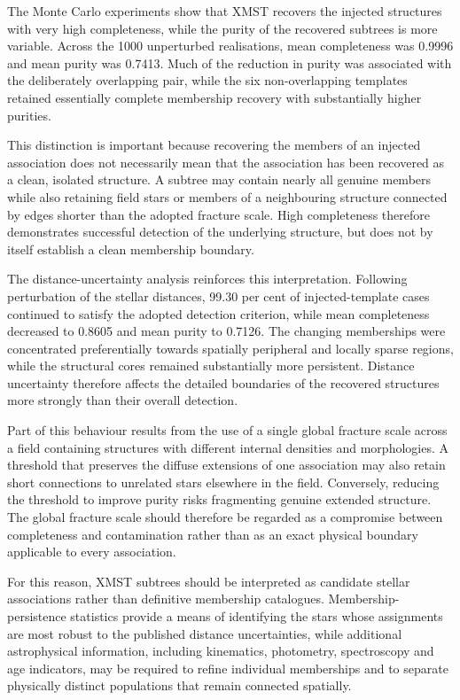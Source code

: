 \documentclass[fleqn,usenatbib]{mnras}
\begin{document}
The Monte Carlo experiments show that XMST recovers the injected structures with very high completeness, while the purity of the recovered subtrees is more variable. Across the 1000 unperturbed realisations, mean completeness was 0.9996 and mean purity was 0.7413. Much of the reduction in purity was associated with the deliberately overlapping pair, while the six non-overlapping templates retained essentially complete membership recovery with substantially higher purities.

This distinction is important because recovering the members of an injected association does not necessarily mean that the association has been recovered as a clean, isolated structure. A subtree may contain nearly all genuine members while also retaining field stars or members of a neighbouring structure connected by edges shorter than the adopted fracture scale. High completeness therefore demonstrates successful detection of the underlying structure, but does not by itself establish a clean membership boundary.

The distance-uncertainty analysis reinforces this interpretation. Following perturbation of the stellar distances, 99.30 per cent of injected-template cases continued to satisfy the adopted detection criterion, while mean completeness decreased to 0.8605 and mean purity to 0.7126. The changing memberships were concentrated preferentially towards spatially peripheral and locally sparse regions, while the structural cores remained substantially more persistent. Distance uncertainty therefore affects the detailed boundaries of the recovered structures more strongly than their overall detection.

Part of this behaviour results from the use of a single global fracture scale across a field containing structures with different internal densities and morphologies. A threshold that preserves the diffuse extensions of one association may also retain short connections to unrelated stars elsewhere in the field. Conversely, reducing the threshold to improve purity risks fragmenting genuine extended structure. The global fracture scale should therefore be regarded as a compromise between completeness and contamination rather than as an exact physical boundary applicable to every association.

For this reason, XMST subtrees should be interpreted as candidate stellar associations rather than definitive membership catalogues. Membership-persistence statistics provide a means of identifying the stars whose assignments are most robust to the published distance uncertainties, while additional astrophysical information, including kinematics, photometry, spectroscopy and age indicators, may be required to refine individual memberships and to separate physically distinct populations that remain connected spatially.
\end{document}
